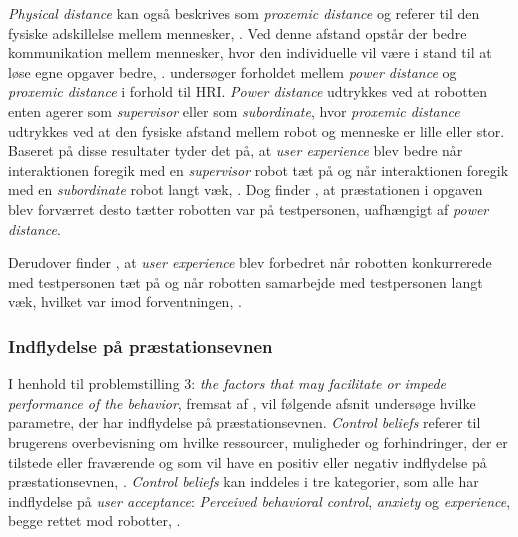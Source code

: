 \textit{Physical distance} kan også beskrives som \textit{proxemic distance} og referer til den fysiske adskillelse mellem mennesker, \parencite[s. 784]{PDF:HowSocialDistanceShapesHRI}. Ved denne afstand opstår der bedre kommunikation mellem mennesker, hvor den individuelle vil være i stand til at løse egne opgaver bedre, \parencite[s. 785]{PDF:HowSocialDistanceShapesHRI}.\blankline
%
\textcite[s. 794]{PDF:HowSocialDistanceShapesHRI} undersøger forholdet mellem \textit{power distance} og \textit{proxemic distance} i forhold til HRI. \textit{Power distance} udtrykkes ved at robotten enten agerer som \textit{supervisor} eller som \textit{subordinate}, hvor \textit{proxemic distance} udtrykkes ved at den fysiske afstand mellem robot og menneske er lille eller stor. Baseret på disse resultater tyder det på, at \textit{user experience} blev bedre når interaktionen foregik med en \textit{supervisor} robot tæt på og når interaktionen foregik med en \textit{subordinate} robot langt væk, \parencite[s. 785]{PDF:HowSocialDistanceShapesHRI}. Dog finder \textcite[s. 785]{PDF:HowSocialDistanceShapesHRI}, at præstationen i opgaven blev forværret desto tætter robotten var på testpersonen, uafhængigt af \textit{power distance}. 

Derudover finder \textcite[s. 785]{PDF:HowSocialDistanceShapesHRI}, at \textit{user experience} blev forbedret når robotten konkurrerede med testpersonen tæt på og når robotten samarbejde med testpersonen langt væk, hvilket var imod forventningen, \parencite[s. 785]{PDF:HowSocialDistanceShapesHRI}.   
%
\subsubsection*{Indflydelse på præstationsevnen}
\label{InteraktionSocialeRobotterParametrePraestation}
%
I henhold til problemstilling 3: \textit{the factors that may facilitate or impede performance of the behavior}, fremsat af \textcite[s. 1477]{PDF:SharingALifeHarvey}, vil følgende afsnit undersøge hvilke parametre, der har indflydelse på præstationsevnen.\blankline
%
\textit{Control beliefs} referer til brugerens overbevisning om hvilke ressourcer, muligheder og forhindringer, der er tilstede eller fraværende og som vil have en positiv eller negativ indflydelse på præstationsevnen, \parencite[s. 1478]{PDF:ExploringInfluencingVariable}. \textit{Control beliefs} kan inddeles i tre kategorier, som alle har indflydelse på \textit{user acceptance}: \textit{Perceived behavioral control}, \textit{anxiety} og \textit{experience}, begge rettet mod robotter, \parencite[s. 1478]{PDF:ExploringInfluencingVariable}. 

